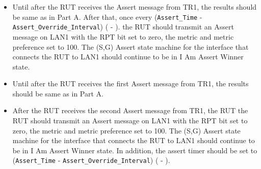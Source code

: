 \documentclass[11pt]{report}
\begin{document}

\begin{itemize}

  \item Until after the RUT receives the Assert message from TR1, the results
  should be same as in Part A. After that, once every \newline
  (\verb=Assert_Time= - \verb=Assert_Override_Interval=)
  ({\PimsmAssertTime} - {\PimsmAssertOverrideInterval}).
  the RUT should transmit an Assert message on LAN1 with the RPT bit set to
  zero, the metric and metric preference set to 100. The (S,G) Assert state
  machine for the interface that connects the RUT to LAN1 should continue to
  be in I Am Assert Winner state.

\end{itemize}


\begin{itemize}

  \item Until after the RUT receives the first Assert message from TR1, the
  results should be same as in Part A.

  \item After the RUT receives the second Assert message from TR1, the RUT
  the RUT should transmit an Assert message on LAN1 with the RPT bit set to
  zero, the metric and metric preference set to 100. The (S,G) Assert state
  machine for the interface that connects the RUT to LAN1 should continue to
  be in I Am Assert Winner state. In addition, the assert timer should be set
  to \newline
  (\verb=Assert_Time= - \verb=Assert_Override_Interval=)
  ({\PimsmAssertTime} - {\PimsmAssertOverrideInterval}).

\end{itemize}

\end{document}
